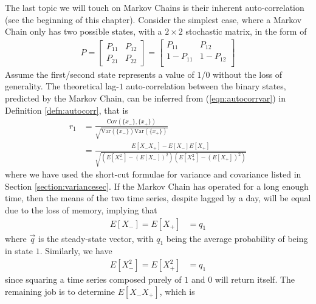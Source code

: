 The last topic we will touch on Markov Chains is their inherent auto-correlation (see the beginning of this chapter). Consider the simplest case, where a Markov Chain only has two possible states, with a $2 \times 2$ stochastic matrix, in the form of
\begin{align}
P = 
\begin{bmatrix}
P_{11} & P_{12} \\
P_{21} & P_{22}
\end{bmatrix}
=
\begin{bmatrix}
P_{11} & P_{12} \\
1 - P_{11} & 1 - P_{12} \\
\end{bmatrix}
\end{align}
Assume the first/second state represents a value of $1$/$0$ without the loss of generality. The theoretical lag-$1$ auto-correlation between the binary states, predicted by the Markov Chain, can be inferred from (\ref{eqn:autocorrvar}) in Definition \ref{defn:autocorr}, that is
\begin{align*}
r_1 &= \frac{\text{Cov}(\{x_{-}\},\{x_{+}\})}{\sqrt{\text{Var}(\{x_{-}\}) \text{Var}(\{x_{+}\})}} \\
&= \frac{E[X_{-}X_{+}] - E[X_{-}]E[X_{+}]}{\sqrt{(E[X_{-}^2] - (E[X_{-}])^2)(E[X_{+}^2] - (E[X_{+}])^2)}}
\end{align*}
where we have used the short-cut formulae for variance and covariance listed in Section \ref{section:variancesec}. If the Markov Chain has operated for a long enough time, then the means of the two time series, despite lagged by a day, will be equal due to the loss of memory, implying that
\begin{align}
E[X_{-}] = E[X_{+}] &= q_1
\end{align}
where $\vec{q}$ is the steady-state vector, with $q_1$ being the average probability of being in state $1$. Similarly, we have
\begin{align}
E[X_{-}^2] = E[X_{+}^2] &= q_1 
\end{align}
since squaring a time series composed purely of $1$ and $0$ will return itself. The remaining job is to determine $E[X_{-}X_{+}]$, which is
